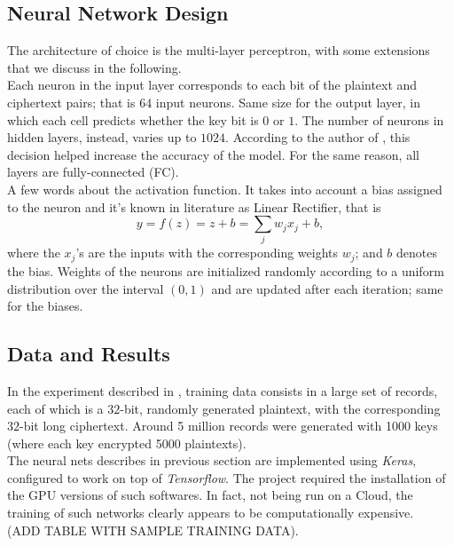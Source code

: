 \documentclass[%
    corpo=11pt,
    twoside,
    stile=classica,
    oldstyle,
    autoretitolo,
    tipotesi=magistrale,
    greek,
    evenboxes,
    english
]{toptesi}
\begin{document}
\subsection{Neural Network Design}
The architecture of choice is the multi-layer perceptron, with some extensions that we discuss in the following. \\
Each neuron in the input layer corresponds to each bit of the plaintext and ciphertext pairs; that is $64$ input neurons. Same size for the output layer, in which each cell predicts whether the key bit is $0$ or $1$. The number of neurons in hidden layers, instead, varies up to $1024$. According to the author of \cite{jay}, this decision helped increase the accuracy of the model. For the same reason, all layers are fully-connected (FC).\\
A few words about the activation function. It takes into account a bias assigned to the neuron and it's known in literature as Linear Rectifier, that is 
\begin{equation}
y = f(z)= z + b = \sum_j w_jx_j + b,
\end{equation}
where the $x_j$'s are the inputs with the corresponding weights $w_j$; and $b$ denotes the bias. Weights of the neurons are initialized randomly according to a uniform distribution over the interval $(0,1)$ and are updated after each iteration; same for the biases.

\subsection{Data and Results}
In the experiment described in \cite{jay}, training data consists in a large set of records, each of which is a $32$-bit, randomly generated plaintext, with the corresponding $32$-bit long ciphertext. Around 5 million records were generated with 1000 keys (where each key encrypted 5000 plaintexts). \\
The neural nets describes in previous section are implemented using \textit{Keras}, configured to work on top of \textit{Tensorflow}. The project required the installation of the GPU versions of such softwares. In fact, not being run on a Cloud, the training of such networks clearly appears to be computationally expensive. \\
(ADD TABLE WITH SAMPLE TRAINING DATA). \\
\end{document}
